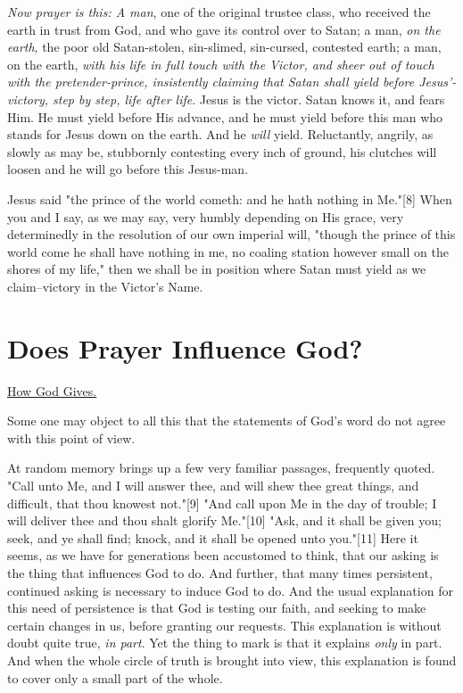 \textit{Now prayer is this: A man}, one of the original trustee class, who
received the earth in trust from God, and who gave its control over to
Satan; a man, \textit{on the earth}, the poor old Satan-stolen, sin-slimed,
sin-cursed, contested earth; a man, on the earth, \textit{with his life in full
touch with the Victor, and sheer out of touch with the pretender-prince,
insistently claiming that Satan shall yield before Jesus'-victory, step by
step, life after life}. Jesus is the victor. Satan knows it, and fears
Him. He must yield before His advance, and he must yield before this man
who stands for Jesus down on the earth. And he \textit{will} yield. Reluctantly,
angrily, as slowly as may be, stubbornly contesting every inch of ground,
his clutches will loosen and he will go before this Jesus-man.

Jesus said "the prince of the world cometh: and he hath nothing in Me."[8]
When you and I say, as we may say, very humbly depending on His grace,
very determinedly in the resolution of our own imperial will, "though the
prince of this world come he shall have nothing in me, no coaling station
however small on the shores of my life," then we shall be in position
where Satan must yield as we claim--victory in the Victor's Name.




\chapter{Does Prayer Influence God?}



\underline{How God Gives.}


Some one may object to all this that the statements of God's word do not
agree with this point of view.

At random memory brings up a few very familiar passages, frequently
quoted. "Call unto Me, and I will answer thee, and will shew thee great
things, and difficult, that thou knowest not."[9] "And call upon Me in the
day of trouble; I will deliver thee and thou shalt glorify Me."[10] "Ask,
and it shall be given you; seek, and ye shall find; knock, and it shall be
opened unto you."[11] Here it seems, as we have for generations been
accustomed to think, that our asking is the thing that influences God to
do. And further, that many times persistent, continued asking is necessary
to induce God to do. And the usual explanation for this need of
persistence is that God is testing our faith, and seeking to make certain
changes in us, before granting our requests. This explanation is without
doubt quite true, \textit{in part}. Yet the thing to mark is that it explains
\textit{only} in part. And when the whole circle of truth is brought into view,
this explanation is found to cover only a small part of the whole.

